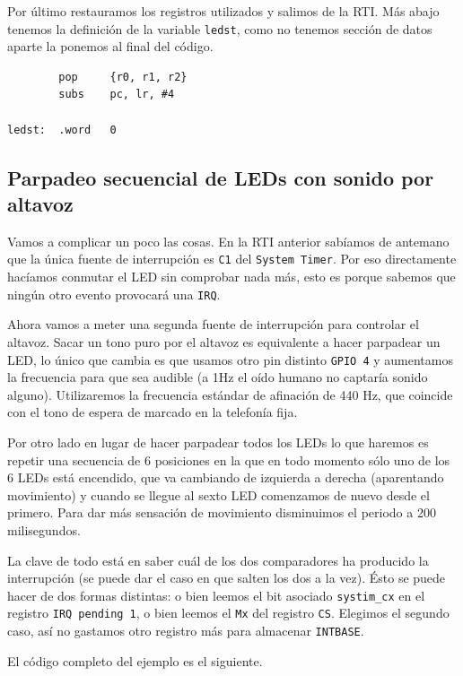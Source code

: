 Por último restauramos los registros utilizados y salimos de la RTI. Más abajo tenemos la
definición de la variable {\tt ledst}, como no tenemos sección de datos aparte la ponemos
al final del código.

\begin{lstlisting}
        pop     {r0, r1, r2}
        subs    pc, lr, #4

ledst:  .word   0
\end{lstlisting}

\subsection{Parpadeo secuencial de LEDs con sonido por altavoz}

Vamos a complicar un poco las cosas. En la RTI anterior sabíamos de antemano que la única fuente
de interrupción es {\tt C1} del {\tt System Timer}. Por eso directamente hacíamos conmutar el
LED sin comprobar nada más, esto es porque sabemos que ningún otro evento provocará una {\tt IRQ}.

Ahora vamos a meter una segunda fuente de interrupción para controlar el altavoz. Sacar un tono
puro por el altavoz es equivalente a hacer parpadear un LED, lo único que cambia es que usamos
otro pin distinto {\tt GPIO 4} y aumentamos la frecuencia para que sea audible (a 1Hz el oído
humano no captaría sonido alguno). Utilizaremos la frecuencia estándar de afinación
de 440 Hz, que coincide con el tono de espera de marcado en la telefonía fija.

Por otro lado en lugar de hacer parpadear todos los LEDs lo que haremos es repetir una
secuencia de 6 posiciones en la que en todo momento sólo uno de los 6 LEDs está encendido, que
va cambiando de izquierda a derecha (aparentando movimiento) y cuando se llegue al sexto LED
comenzamos de nuevo desde el primero. Para dar más sensación de movimiento disminuimos el periodo
a 200 milisegundos.

La clave de todo está en saber cuál de los dos comparadores ha producido la interrupción (se
puede dar el caso en que salten los dos a la vez). Ésto se puede hacer de dos formas distintas:
o bien leemos el bit asociado {\tt systim\_cx} en el registro {\tt IRQ pending 1}, o bien leemos
el {\tt Mx} del registro {\tt CS}. Elegimos el segundo caso, así no gastamos otro registro más
para almacenar {\tt INTBASE}.

El código completo del ejemplo es el siguiente.

